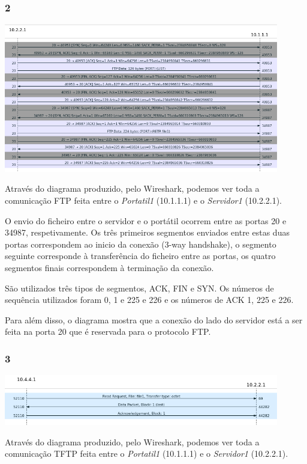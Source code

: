 \documentclass{article}
\begin{document}
            \subsubsection*{2}
                {
                    \centering
                    \includegraphics[width=12cm]{images/ftp-flow-graph.png}
                    \par
                }
                    Através do diagrama produzido, pelo Wireshark, podemos ver toda a comunicação FTP feita entre o \textit{Portatil1} (10.1.1.1) e o \textit{Servidor1} (10.2.2.1).

		            O envio do ficheiro entre o servidor e o portátil ocorrem entre as portas 20 e 34987, respetivamente. Os três primeiros segmentos enviados entre estas duas portas correspondem ao inicio da conexão (3-way handshake), o segmento seguinte corresponde à transferência do ficheiro entre as portas, os quatro segmentos finais correspondem à terminação da conexão.

	São utilizados três tipos de segmentos, ACK, FIN e SYN. Os números de sequência utilizados foram 0, 1 e 225 e 226 e os números de ACK 1, 225 e 226.

                    Para além disso, o diagrama mostra que a conexão do lado do servidor está a ser feita na porta 20 que é reservada para o protocolo FTP.
            \subsubsection*{3}
                {
                    \centering
                    \includegraphics[width=12cm]{images/tftp-wireshark-flow-graph.png}
                    \par
                }
		            Através do diagrama produzido, pelo Wireshark, podemos ver toda a comunicação TFTP feita entre o \textit{Portatil1} (10.1.1.1) e o \textit{Servidor1} (10.2.2.1).
\end{document}
